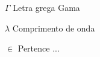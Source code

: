 
\begin{simbolos}
    \item[$ \Gamma $] Letra grega Gama
    \item[$ \lambda $] Comprimento de onda
    \item[$ \in $] Pertence ...
\end{simbolos}

